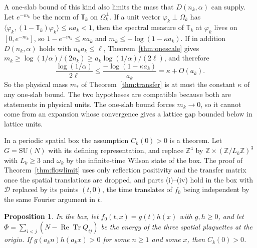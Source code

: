 \documentclass[11pt]{amsart}
\newtheorem{proposition}[theorem]{Proposition}
\theoremstyle{definition}
\theoremstyle{remark}
\numberwithin{equation}{section}
\newcommand{\Z}{\mathbb{Z}}
\newcommand{\SU}{\mathrm{SU}}
\newcommand{\ReTr}{\operatorname{Re}\operatorname{Tr}}
\newcommand{\ip}[2]{\langle #1,#2\rangle}
\begin{document}
A one-slab bound of this kind also limits the mass that $D(n_k,\alpha)$
can supply. Let $e^{-m_k}$ be the norm of $\mathbb T_k$ on $\Omega_k^\perp$.
If a unit vector $\varphi_k\perp\Omega_k$ has $\ip{\varphi_k}{(1-\mathbb
T_k)\varphi_k}\le\kappa a_k<1$, then the spectral measure of $\mathbb T_k$
at $\varphi_k$ lives on $[0,e^{-m_k}]$, so $1-e^{-m_k}\le\kappa a_k$ and
$m_k\le-\log(1-\kappa a_k)$. If in addition $D(n_k,\alpha)$ holds with
$n_ka_k\le\ell$, Theorem~\ref{thm:onescale} gives $m_k\ge\log(1/\alpha)
/(2n_k)\ge a_k\log(1/\alpha)/(2\ell)$, and therefore
\[
\frac{\log(1/\alpha)}{2\ell}\le\frac{-\log(1-\kappa a_k)}{a_k}=\kappa+
O(a_k).
\]
So the physical mass $m_*$ of Theorem~\ref{thm:transfer} is at most the
constant $\kappa$ of any one-slab bound. The two hypotheses are compatible
because both are statements in physical units. The one-slab bound forces
$m_k\to0$, so it cannot come from an expansion whose convergence gives a
lattice gap bounded below in lattice units.


In a periodic spatial box the assumption $C_k(0)>0$ is a theorem. Let
$G=\SU(N)$ with its defining representation, and replace $\Z^4$ by
$\Z\times(\Z/L_k\Z)^3$ with $L_k\ge3$ and $\omega_k$ by the infinite-time
Wilson state of the box. The proof of Theorem~\ref{thm:flowlimit} uses only
reflection positivity and the transfer matrix once the spatial translations
are dropped, and parts (i)--(iv) hold in the box with $\mathcal D$ replaced by
its points $(t,0)$, the time translates of $f_0$ being independent by the
same Fourier argument in $t$.

\begin{proposition}\label{prop:flowpositive}
In the box, let $f_0(t,x)=g(t)h(x)$ with $g,h\ge0$, and let $\Phi=\sum_{i<j}
(N-\ReTr Q_{ij})$ be the energy of the three spatial plaquettes at the origin.
If $g(a_kn)h(a_kx)>0$ for some $n\ge1$ and some $x$, then $C_k(0)>0$.
\end{proposition}
\end{document}
